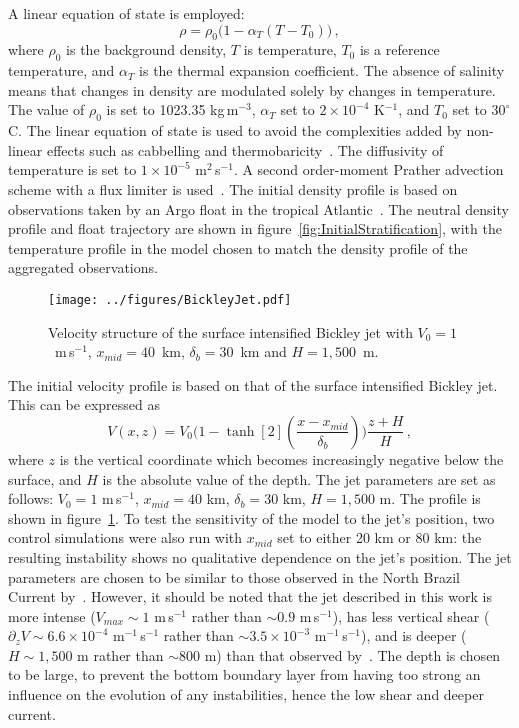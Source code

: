 A linear equation of state is employed:
\begin{equation}
    \rho = \rho_{0} \big(1 - \alpha_T (T - T_0 )\big) \, ,
    \label{eq:EOS}
\end{equation}
where $\rho_{0}$ is the background density, $T$ is temperature, $T_0$ is a reference temperature, and $\alpha_T$ is the thermal expansion coefficient. The absence of salinity means that changes in density are modulated solely by changes in temperature. The value of $\rho_{0}$ is set to 1023.35 kg$\,$m$^{-3}$, $\alpha_T$  set to $2 \times 10^{-4}$ K$^{-1}$, and $T_0$ set to $30^{\circ}$C. The linear equation of state is used to avoid the complexities added by non-linear effects such as cabbelling and thermobaricity~\citep[e.g.][]{Groeskamp2016}. The diffusivity of temperature is set to $1 \times 10^{-5}$ m$^2$\,s$^{-1}$. A second order-moment Prather advection scheme with a flux limiter is used~\citep{Prather1986}. The initial density profile is based on observations taken by an Argo float in the tropical Atlantic~\citep{Argo2022}. The neutral density profile and float trajectory are shown in figure~\ref{fig:InitialStratification}, with the temperature profile in the model chosen to match the density profile of the aggregated observations.

\begin{figure}[t]
    \centering
    \texttt{[image: ../figures/BickleyJet.pdf]}
    \caption{Velocity structure of the surface intensified Bickley jet with $V_0 = 1$~m$\,$s$^{-1}$, $x_{mid} = 40$~km, $\delta_b = 30$~km and $H = 1,500$~m.}
    \label{fig:SurfIntBickleyJet}
\end{figure}

The initial velocity profile is based on that of the surface intensified Bickley jet. This can be expressed as
\begin{equation}
    V(x, z) = V_0 \Bigg( 1 - \tanh[2](\frac{x - x_{mid}}{\delta_b})\Bigg) \frac{z + H}{H} \, ,
\end{equation}
where $z$ is the vertical coordinate which becomes increasingly negative below the surface, and $H$ is the absolute value of the depth. The jet parameters are set as follows: $V_0 = 1$ m\,s$^{-1}$, $x_{mid} = 40$ km, $\delta_b = 30$ km, $H = 1,500$ m. The profile is shown in figure~\ref{fig:SurfIntBickleyJet}. To test the sensitivity of the model to the jet's position, two control simulations were also run with $x_{mid}$ set to either 20 km or 80 km: the resulting instability shows no qualitative dependence on the jet's position. The jet parameters are chosen to be similar to those observed in the North Brazil Current by~\citet{Johns1998}. However, it should be noted that the jet described in this work is more intense ($V_{max} \sim 1$ m\,s$^{-1}$ rather than $\sim 0.9$ m\,s$^{-1}$), has less vertical shear ($\partial_z V \sim 6.6\times 10^{-4}$ m$^{-1}$\,s$^{-1}$ rather than $\sim 3.5 \times 10^{-3}$ m$^{-1}$\,s$^{-1}$), and is deeper ($H\sim 1,500$ m rather than $\sim 800$ m) than that observed by~\citet{Johns1998}. The depth is chosen to be large, to prevent the bottom boundary layer from having too strong an influence on the evolution of any instabilities, hence the low shear and deeper current.

